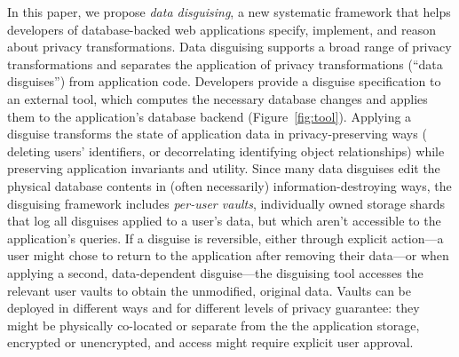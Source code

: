 %
%
%
%
%

%
%

%
In this paper, we propose \emph{data disguising}, a new systematic framework that helps developers
of database-backed web applications specify, implement, and reason about privacy transformations.
%
Data disguising supports a broad range of privacy transformations and separates the application
of privacy transformations (``data disguises'') from application code.
%
Developers provide a disguise specification to an external tool, which computes the necessary
database changes and applies them to the application's database backend (Figure~\ref{fig:tool}).
%
Applying a disguise transforms the state of application data in privacy-preserving ways (\eg
deleting users' identifiers, or decorrelating identifying object relationships) while preserving
application invariants and utility.
%
Since many data disguises edit the physical database contents in (often necessarily)
information-destroying ways, the disguising framework includes \emph{per-user vaults},
individually owned storage shards that log all disguises applied to a user's data, but which
aren't accessible to the application's queries.
%
If a disguise is reversible, either through explicit action---\eg a user might chose to return
to the application after removing their data---or when applying a second, data-dependent
disguise---the disguising tool accesses the relevant user vaults to obtain the unmodified,
original data.
%
Vaults can be deployed in different ways and for different levels of privacy guarantee: they
might be physically co-located or separate from the the application storage, encrypted or
unencrypted, and access might require explicit user approval.
%

